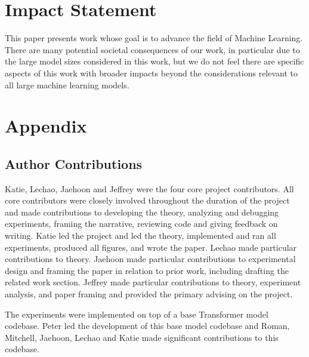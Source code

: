 \documentclass{article}
\theoremstyle{plain}
\theoremstyle{definition}
\theoremstyle{remark}
\begin{document}
\section*{Impact Statement}
This paper presents work whose goal is to advance the field of Machine Learning. There are many potential societal consequences of our work, in particular due to the large model sizes considered in this work, but we do not feel there are specific aspects of this work with broader impacts beyond the considerations relevant to all large machine learning models.





% 

\newpage
\setcounter{section}{0}

\appendix
\onecolumn
\appendix
{}
\section*{Appendix}\label{sec:appendix}
\setcounter{section}{0}
\renewcommand{\thesubsection}{\Alph{subsection}}

\renewcommand\thefigure{\thesubsection\arabic{figure}}
\renewcommand\thetable{\thesubsection\arabic{table}}

\subsection{Author Contributions}
Katie, Lechao, Jaehoon and Jeffrey were the four core project contributors. All core contributors were closely involved throughout the duration of the project and made contributions to developing the theory, analyzing and debugging experiments, framing the narrative, reviewing code and giving feedback on writing. Katie led the project and led the theory, implemented and ran all experiments, produced all figures, and wrote the paper. Lechao made particular contributions to theory. Jaehoon made particular contributions to experimental design and framing the paper in relation to prior work, including drafting the related work section. Jeffrey made particular contributions to theory, experiment analysis, and paper framing and provided the primary advising on the project.

The experiments were implemented on top of a base Transformer model codebase. Peter led the development of this base model codebase and Roman, Mitchell, Jaehoon, Lechao and Katie made significant contributions to this codebase.
\end{document}
